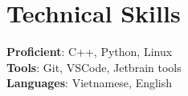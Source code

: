 \documentclass[letterpaper,11pt]{article}
\begin{document}
%
\section{Technical Skills}
 \begin{itemize}[leftmargin=0.15in, label={}]
    \small{\item{
     \textbf{Proficient}{: C++, Python, Linux} \\
     \textbf{Tools}{: Git, VSCode, Jetbrain tools} \\
     \textbf{Languages}{: Vietnamese, English} \\
    }}
 \end{itemize}

\end{document}
